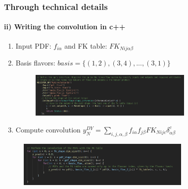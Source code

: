 \documentclass[aspectratio=43]{beamer}
\begin{document}
\begin{frame}
	
	\frametitle{Through technical details}
	\framesubtitle{ii) Writing the convolution in c++}
	
	\begin{enumerate}
		\item Input PDF: $f_{i \alpha}$ and FK table: $FK_{N i j \alpha \beta}$
		\item Basis flavors: $basis = \{(1, 2), (3, 4), ..., (3, 1)\}$
		\begin{figure}
			\includegraphics[width = 0.75\textwidth]{myconvdy.png}
		\end{figure}
		\item Compute convolution $y_{N}^{DY} = \sum_{i, j, \alpha, \beta} f_{i \alpha} f_{j \beta} FK_{N i j c} \delta^{c}_{\alpha \beta}$
	\end{enumerate}
	\begin{figure}
		\includegraphics[width = 0.75\textwidth]{myconvdy2.png}
	\end{figure}

\end{frame}
\end{document}
